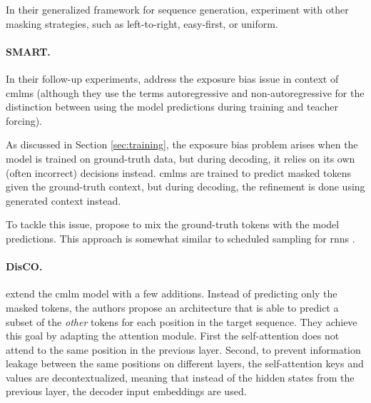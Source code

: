 In their generalized framework for sequence generation,
\citet{mansimov2019generalized} experiment with other masking strategies, such
as left-to-right, easy-first, or uniform.

\paragraph{SMART.} In their follow-up experiments,
\citet{ghazvininejad-etal-2020-semiautoregressive} address the exposure bias
issue in context of \acp{cmlm} (although they use the terms autoregressive and
non-autoregressive for the distinction between using the model predictions
during training and teacher forcing).

As discussed in Section \ref{sec:training}, the exposure bias problem arises
when the model is trained on ground-truth data, but during decoding, it relies
on its own (often incorrect) decisions instead. \Acp{cmlm} are trained to
predict masked tokens given the ground-truth context, but during decoding, the
refinement is done using generated context instead.

To tackle this issue, \citet{ghazvininejad-etal-2020-semiautoregressive}
propose to mix the ground-truth tokens with the model predictions. This
approach is somewhat similar to scheduled sampling for \aclp{rnn}
\citep{bengio2015scheduled}.

\paragraph{DisCO.} %
\citet{kasai2020nonautoregressive} extend the \ac{cmlm} model with a few
additions. Instead of predicting only the masked tokens, the authors propose an
architecture that is able to predict a subset of the \emph{other} tokens for
each position in the target sequence. They achieve this goal by adapting the
attention module. First the self-attention does not attend to the same position
in the previous layer. Second, to prevent information leakage between the same
positions on different layers, the self-attention keys and values are
decontextualized, meaning that instead of the hidden states from the previous
layer, the decoder input embeddings are used.

